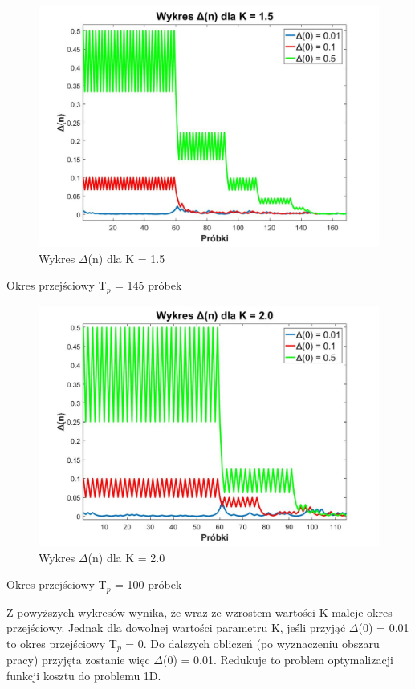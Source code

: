 \documentclass[12pt, a4paper, oneside]{article}
\begin{document}
\clearpage
\begin{figure}[h]
\centering
\caption{Wykres $\Delta$(n) dla K = 1.5}
\includegraphics[scale=0.33]{f3.jpg}
\end{figure}
\begin{center}
Okres przejściowy T$_p$ = 145 próbek
\end{center}
\begin{figure}[h]
\centering
\caption{Wykres $\Delta$(n) dla K = 2.0}
\includegraphics[scale=0.33]{f4.jpg}
\end{figure}
\begin{center}
Okres przejściowy T$_p$ = 100 próbek
\end{center}
\indent\indent Z powyższych wykresów wynika, że wraz ze wzrostem wartości K maleje okres przejściowy. Jednak dla dowolnej wartości parametru K, jeśli przyjąć $\Delta$(0) = 0.01  to okres przejściowy T$_p$ = 0. Do dalszych obliczeń (po wyznaczeniu obszaru pracy) przyjęta zostanie więc $\Delta$(0) = 0.01. Redukuje to problem optymalizacji funkcji kosztu do problemu 1D.
\clearpage
\end{document}
